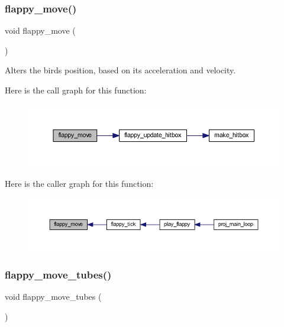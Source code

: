 \subsubsection{\texorpdfstring{flappy\+\_\+move()}{flappy\_move()}}
{\footnotesize\ttfamily void flappy\+\_\+move (\begin{DoxyParamCaption}{ }\end{DoxyParamCaption})}



Alters the bird\textquotesingle{}s position, based on its acceleration and velocity. 

Here is the call graph for this function\+:\nopagebreak
\begin{figure}[H]
\begin{center}
\leavevmode
\includegraphics[width=350pt]{group__flappy_ga92fa31f2712c1d2f899246a5fd5913ab_cgraph}
\end{center}
\end{figure}
Here is the caller graph for this function\+:\nopagebreak
\begin{figure}[H]
\begin{center}
\leavevmode
\includegraphics[width=350pt]{group__flappy_ga92fa31f2712c1d2f899246a5fd5913ab_icgraph}
\end{center}
\end{figure}
\mbox{\label{group__flappy_gaa9297621f8ee414c88d82528044d564e}} 
\subsubsection{\texorpdfstring{flappy\+\_\+move\+\_\+tubes()}{flappy\_move\_tubes()}}
{\footnotesize\ttfamily void flappy\+\_\+move\+\_\+tubes (\begin{DoxyParamCaption}{ }\end{DoxyParamCaption})}



